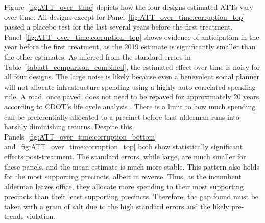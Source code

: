 Figure~\ref{fig:ATT_over_time} depicts how the four designs estimated ATTs vary over time.
All designs except for Panel~\ref{fig:ATT_over_time:corruption_top} passed a placebo test for the last several years before the first treatment.
Panel~\ref{fig:ATT_over_time:corruption_top} shows evidence of anticipation in the year before the first treatment, as the 2019 estimate is significantly smaller than the other estimates.
As inferred from the standard errors in Table~\ref{tab:att_comparison_combined}, the estimated effect over time is noisy for all four designs.
The large noise is likely because even a benevolent social planner will not allocate infrastructure spending using a highly auto-correlated spending rule.
A road, once paved, does not need to be repaved for approximately 20 years, according to CDOT's life cycle analysis \citep{OIGaudit}.
There is a limit to how much spending can be preferentially allocated to a precinct before that alderman runs into harshly diminishing returns.
Despite this, Panels~\ref{fig:ATT_over_time:corruption_bottom} and~\ref{fig:ATT_over_time:corruption_top} both show statistically significant effects post-treatment.
The standard errors, while large, are much smaller for these panels, and the mean estimate is much more stable.
This pattern also holds for the most supporting precincts, albeit in reverse.
Thus, as the incumbent alderman leaves office, they allocate more spending to their most supporting precincts than their least supporting precincts.
Therefore, the gap found must be taken with a grain of salt due to the high standard errors and the likely pre-trends violation.

